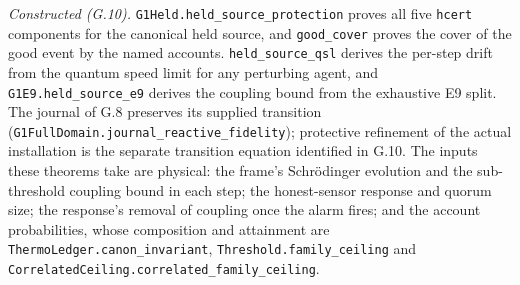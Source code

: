 \documentclass[
]{article}
\begin{document}
\emph{Constructed (G.10).}
\texttt{G\allowbreak{}1\allowbreak{}H\allowbreak{}e\allowbreak{}l\allowbreak{}d\allowbreak{}.\allowbreak{}h\allowbreak{}e\allowbreak{}l\allowbreak{}d\allowbreak{}\_\allowbreak{}s\allowbreak{}o\allowbreak{}u\allowbreak{}r\allowbreak{}c\allowbreak{}e\allowbreak{}\_\allowbreak{}p\allowbreak{}r\allowbreak{}o\allowbreak{}t\allowbreak{}e\allowbreak{}c\allowbreak{}t\allowbreak{}i\allowbreak{}o\allowbreak{}n}
proves all five \texttt{hcert} components for the canonical held source,
and \texttt{good\_cover} proves the cover of the good event by the named
accounts. \texttt{held\_source\_qsl} derives the per-step drift from the
quantum speed limit for any perturbing agent, and
\texttt{G\allowbreak{}1\allowbreak{}E\allowbreak{}9\allowbreak{}.\allowbreak{}h\allowbreak{}e\allowbreak{}l\allowbreak{}d\allowbreak{}\_\allowbreak{}s\allowbreak{}o\allowbreak{}u\allowbreak{}r\allowbreak{}c\allowbreak{}e\allowbreak{}\_\allowbreak{}e\allowbreak{}9}
derives the coupling bound from the exhaustive E9 split. The journal of
G.8 preserves its supplied transition
(\texttt{G\allowbreak{}1\allowbreak{}F\allowbreak{}u\allowbreak{}l\allowbreak{}l\allowbreak{}D\allowbreak{}o\allowbreak{}m\allowbreak{}a\allowbreak{}i\allowbreak{}n\allowbreak{}.\allowbreak{}j\allowbreak{}o\allowbreak{}u\allowbreak{}r\allowbreak{}n\allowbreak{}a\allowbreak{}l\allowbreak{}\_\allowbreak{}r\allowbreak{}e\allowbreak{}a\allowbreak{}c\allowbreak{}t\allowbreak{}i\allowbreak{}v\allowbreak{}e\allowbreak{}\_\allowbreak{}f\allowbreak{}i\allowbreak{}d\allowbreak{}e\allowbreak{}l\allowbreak{}i\allowbreak{}t\allowbreak{}y});
protective refinement of the actual installation is the separate
transition equation identified in G.10. The inputs these theorems take
are physical: the frame's Schrödinger evolution and the sub-threshold
coupling bound in each step; the honest-sensor response and quorum size;
the response's removal of coupling once the alarm fires; and the account
probabilities, whose composition and attainment are
\texttt{T\allowbreak{}h\allowbreak{}e\allowbreak{}r\allowbreak{}m\allowbreak{}o\allowbreak{}L\allowbreak{}e\allowbreak{}d\allowbreak{}g\allowbreak{}e\allowbreak{}r\allowbreak{}.\allowbreak{}c\allowbreak{}a\allowbreak{}n\allowbreak{}o\allowbreak{}n\allowbreak{}\_\allowbreak{}i\allowbreak{}n\allowbreak{}v\allowbreak{}a\allowbreak{}r\allowbreak{}i\allowbreak{}a\allowbreak{}n\allowbreak{}t},
\texttt{T\allowbreak{}h\allowbreak{}r\allowbreak{}e\allowbreak{}s\allowbreak{}h\allowbreak{}o\allowbreak{}l\allowbreak{}d\allowbreak{}.\allowbreak{}f\allowbreak{}a\allowbreak{}m\allowbreak{}i\allowbreak{}l\allowbreak{}y\allowbreak{}\_\allowbreak{}c\allowbreak{}e\allowbreak{}i\allowbreak{}l\allowbreak{}i\allowbreak{}n\allowbreak{}g}
and
\texttt{C\allowbreak{}o\allowbreak{}r\allowbreak{}r\allowbreak{}e\allowbreak{}l\allowbreak{}a\allowbreak{}t\allowbreak{}e\allowbreak{}d\allowbreak{}C\allowbreak{}e\allowbreak{}i\allowbreak{}l\allowbreak{}i\allowbreak{}n\allowbreak{}g\allowbreak{}.\allowbreak{}c\allowbreak{}o\allowbreak{}r\allowbreak{}r\allowbreak{}e\allowbreak{}l\allowbreak{}a\allowbreak{}t\allowbreak{}e\allowbreak{}d\allowbreak{}\_\allowbreak{}f\allowbreak{}a\allowbreak{}m\allowbreak{}i\allowbreak{}l\allowbreak{}y\allowbreak{}\_\allowbreak{}c\allowbreak{}e\allowbreak{}i\allowbreak{}l\allowbreak{}i\allowbreak{}n\allowbreak{}g}.
\end{document}
